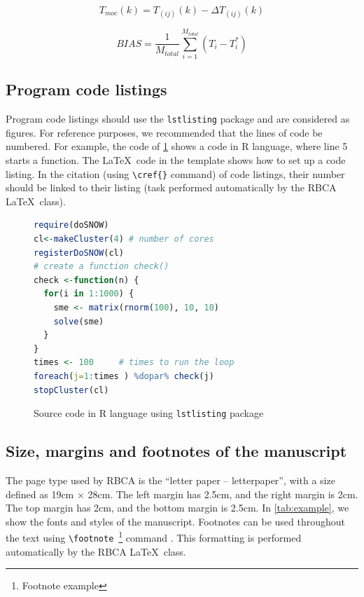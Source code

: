 \documentclass[alpha-refs,brazilian]{RBCA_v3.0}
\begin{document}
\begin{equation}
	T_{moc}(\textit{k}) =  T_{(ij)}(\textit{k}) - \Delta T_{(ij)} (\textit{k})
\label{eq:example2}
\end{equation}

\begin{equation}
BIAS = \frac{1}{M_{total} }\sum_{i=1}^{M_{total}} (T_{i} - T^{*}_{i})
\label{eq:example3}
\end{equation}


\subsection{Program code listings}

Program code listings should use the \verb|lstlisting| package and are considered as figures. For reference purposes, we recommended that the lines of code be numbered. For example, the code of \cref{lst:R_code} shows a code in R language, where line 5 starts a function. The \LaTeX\ code in the template shows how to set up a code listing. In the citation (using \verb|\cref{}| command) of code listings, their number should be linked to their listing (task performed automatically by the RBCA \LaTeX\ class).

\begin{figure}[hb!]
\begin{lstlisting}[language=R]
require(doSNOW)
cl<-makeCluster(4) # number of cores
registerDoSNOW(cl)
# create a function check()
check <-function(n) {
  for(i in 1:1000) {
    sme <- matrix(rnorm(100), 10, 10)
    solve(sme)
  }
}
times <- 100     # times to run the loop
foreach(j=1:times ) %dopar% check(j)
stopCluster(cl)
\end{lstlisting}	
\caption{Source code in R language using \texttt{lstlisting} package}
\label{lst:R_code}
\end{figure}


\subsection{Size, margins and footnotes of the manuscript}
The page type used by RBCA is the ``letter paper -- letterpaper'', with a size defined as 19cm $\times$ 28cm. The left margin has 2.5cm, and the right margin is 2cm. The top margin has 2cm, and the bottom margin is 2.5cm. In \cref{tab:example}, we show the fonts and styles of the manuscript. Footnotes can be used throughout the text using \verb|\footnote|~\footnote{Footnote example} command . This formatting is performed automatically by the RBCA \LaTeX\ class.
\end{document}
